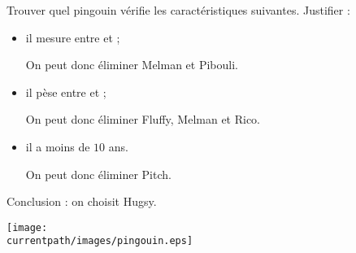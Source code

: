     Trouver quel pingouin vérifie les caractéristiques suivantes. Justifier :
    \begin{itemize}
       \item il mesure entre  et  ;

       {\color{red} On peut donc éliminer Melman et Pibouli.}
       \item il pèse entre  et  ;

       {\color{red} On peut donc éliminer Fluffy, Melman et Rico.}
       \item il a moins de $10$ ans.

       {\color{red} On peut donc éliminer Pitch.}
    \end{itemize}

    {\red Conclusion : on choisit Hugsy}.

   \begin{center}
       \hspace*{-10mm}
       \texttt{[image: \\currentpath/images/pingouin.eps]}
    \end{center}
